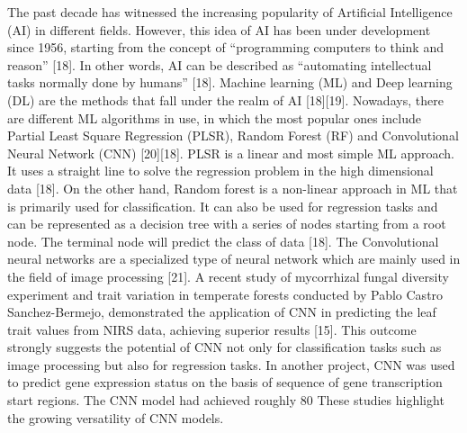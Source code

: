 \documentclass[12pt,a4paper]{report}
\begin{document}
The past decade has witnessed the increasing popularity of  Artificial Intelligence (AI) in different fields. However, this idea of AI has been under development since 1956, starting from the concept of “programming computers to think and reason” [18]. In other words, AI can be described as “automating intellectual tasks normally done by humans” [18]. Machine learning (ML) and Deep learning (DL) are the methods that fall under the realm of AI [18][19]. 
Nowadays, there are different ML algorithms in use, in which the most popular ones include Partial Least Square Regression (PLSR), Random Forest (RF) and Convolutional Neural Network (CNN) [20][18]. PLSR is a linear and most simple ML approach. It uses a straight line to solve the regression problem in the high dimensional data [18]. On the other hand,  Random forest is a non-linear approach in ML that is primarily used for classification. It can also 
be used for regression tasks and can be represented as a decision tree with a series of nodes starting from a root node. The terminal node will predict the class of data [18]. The Convolutional neural networks are a specialized type of neural network which are mainly used in the field of image processing [21]. A recent study of mycorrhizal fungal diversity experiment and  trait variation in temperate forests  conducted by Pablo Castro Sanchez-Bermejo, 
demonstrated the application of CNN in predicting the leaf trait values from NIRS data, achieving superior results [15]. This outcome strongly suggests the potential of CNN not only for classification tasks such as image processing but also for regression tasks. In another project, CNN was used to predict gene expression status on the basis of sequence of gene transcription start regions. The CNN model had achieved roughly 80%
These studies highlight the growing versatility of CNN models. \\
\end{document}
